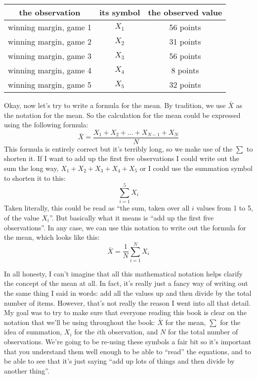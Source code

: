 \begin{center}
\begin{tabular}{ccc}
the observation & its symbol & the observed value \\ \hline
winning margin, game 1 & $X_1$ & 56 points \\
winning margin, game 2 & $X_2$ & 31 points \\
winning margin, game 3 & $X_3$ & 56 points \\
winning margin, game 4 & $X_4$ & 8 points \\
winning margin, game 5 & $X_5$ & 32 points \\
\end{tabular}
\end{center}

\vspace{0.5cm}
\begin{mdframed}[style=MyFrame,nobreak=true]
Okay, now let's try to write a formula for the mean. By tradition, we use $\bar{X}$ as the notation for the mean. So the calculation for the mean could be expressed using the following formula:
$$
\bar{X} = \frac{X_1 + X_2 + \ldots + X_{N-1} + X_N}{N}
$$
This formula is entirely correct but it's terribly long, so we make use of the  $\scriptstyle\sum$ to shorten it. If I want to add up the first five observations I could write out the sum the long way, $X_1 + X_2 + X_3 + X_4 +X_5$ or I could use the summation symbol to shorten it to this:
$$
\sum_{i=1}^5 X_i
$$
Taken literally, this could be read as ``the sum, taken over all $i$ values from 1 to 5, of the value $X_i$''. But basically what it means is ``add up the first five observations''. In any case, we can use this notation to write out the formula for the mean, which looks like this:
$$
\bar{X} = \frac{1}{N} \sum_{i=1}^N X_i 
$$

In all honesty, I can't imagine that all this mathematical notation helps clarify the concept of the mean at all. In fact, it's really just a fancy way of writing out the same thing I said in words: add all the values up and then divide by the total number of items. However, that's not really the reason I went into all that detail. My goal was to try to make sure that everyone reading this book is clear on the notation that we'll be using throughout the book: $\bar{X}$ for the mean, $\scriptstyle\sum$ for the idea of summation, $X_i$ for the $i$th observation, and $N$ for the total number of observations. We're going to be re-using these symbols a fair bit so it's important that you understand them well enough to be able to ``read'' the equations, and to be able to see that it's just saying ``add up lots of things and then divide by another thing''.
\end{mdframed}

